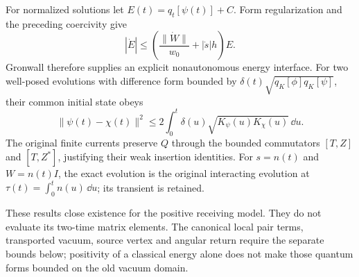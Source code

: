 For normalized solutions let $E(t)=q_t[\psi(t)]+C$. Form regularization and
the preceding coercivity give
\[
 |\dot E|\le\left(\frac{\|\dot W\|}{w_0}+|\dot s|h\right)E.
\]
Gronwall therefore supplies an explicit nonautonomous energy interface.
For two well-posed evolutions with difference form bounded by
$\delta(t)\sqrt{q_K[\phi]q_K[\psi]}$, their common initial state obeys
\[
 \|\psi(t)-\chi(t)\|^2\le
 2\int_0^t\delta(u)\sqrt{K_\psi(u)K_\chi(u)}\,\dd u.
\]
The original finite currents preserve $Q$ through the bounded commutators
$[T,Z]$ and $[T,Z^*]$, justifying their weak insertion identities.
For $s=n(t)$ and $W=n(t)I$, the exact evolution is the original interacting
evolution at $\tau(t)=\int_0^tn(u)\,\dd u$; its transient is retained.

These results close existence for the positive receiving model.
They do not evaluate its two-time matrix elements. The canonical local
pair terms, transported vacuum, source vertex and angular return require
the separate bounds below; positivity of a classical energy alone does
not make those quantum forms bounded on the old vacuum domain.
